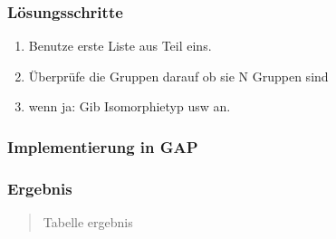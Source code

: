\documentclass{beamer}
\begin{document}
\begin{frame}
	\frametitle{Lösungsschritte}
	\begin{enumerate}
	 \item Benutze erste Liste aus Teil eins.
	 \item Überprüfe die Gruppen darauf ob sie N Gruppen sind
	 \item wenn ja: Gib Isomorphietyp usw an. 		 
	\end{enumerate}
\end{frame}

\begin{frame}
	\frametitle{Implementierung in GAP}
	\begin{quote}
	 
		 
	\end{quote}
\end{frame}

\begin{frame}
	\frametitle{Ergebnis}
	\begin{quote}
	 Tabelle ergebnis
		 
	\end{quote}
\end{frame}
\end{document}
